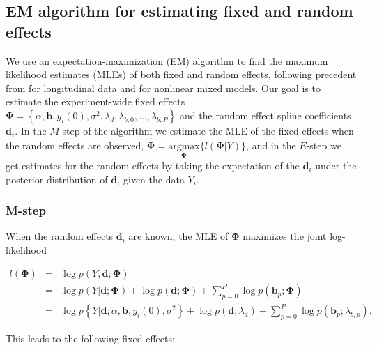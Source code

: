 \documentclass[preprint]{JASA}
\begin{document}
\hypertarget{em-algorithm-for-estimating-fixed-and-random-effects}{%
\subsection{EM algorithm for estimating fixed and random
effects}\label{em-algorithm-for-estimating-fixed-and-random-effects}}

\label{sec:em_algorithm}

We use an expectation-maximization (EM) algorithm to find the maximum
likelihood estimates (MLEs) of both fixed and random effects, following
precedent from \cite{laird1982} for longitudinal data and
\cite{walker1996} for nonlinear mixed models. Our goal is to estimate
the experiment-wide fixed effects
\(\mathbf{\Phi} = \left\{\alpha, \mathbf{b}, y_i(0), \sigma^2, \lambda_d, \lambda_{b, 0}, \ldots, \lambda_{b, P}\right\}\)
and the random effect spline coefficients \(\mathbf{d}_i\). In the
\(M\)-step of the algorithm we estimate the MLE of the fixed effects
when the random effects are observed,
\(\widehat{\mathbf{\Phi}} = \underset{\mathbf{\Phi}}{\mathrm{argmax}}\{l(\mathbf{\Phi} | Y)\}\),
and in the \(E\)-step we get estimates for the random effects by taking
the expectation of the \(\mathbf{d}_i\) under the posterior distribution
of \(\mathbf{d}_i\) given the data \(Y_i\).

\hypertarget{m-step}{%
\subsubsection{M-step}\label{m-step}}

When the random effects \(\mathbf{d}_i\) are known, the MLE of
\(\mathbf{\Phi}\) maximizes the joint log-likelihood

\begin{eqnarray*}
l(\mathbf{\Phi}) &=& \log p(Y,  \mathbf{d} ; \mathbf{\Phi})\\
&=&  \log p(Y|  \mathbf{d} ; \mathbf{\Phi}) + \log p(\mathbf{d}; \mathbf{\Phi}) + \sum_{p = 0}^P\log p(\mathbf{b}_p; \mathbf{\Phi})\\
&=&  \log p\left\{Y|  \mathbf{d} ; \alpha, \mathbf{b}, y_i(0), \sigma^2\right\} + \log p(\mathbf{d} ; \lambda_d) + \sum_{p = 0}^P\log p(\mathbf{b}_p ; \lambda_{b, p}).
\end{eqnarray*}

\noindent This leads to the following fixed effects:
\end{document}
